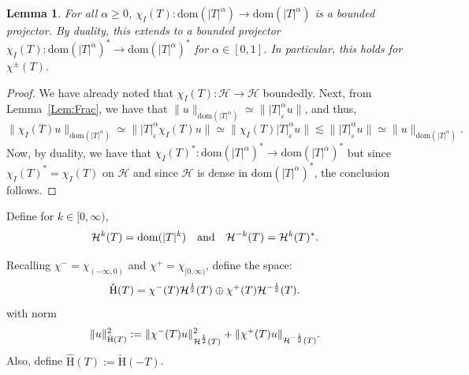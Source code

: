 \documentclass[a4paper,10pt,reqno]{amsart}
\newcommand{\modulus}[1]{|#1|}
\newcommand{\norm}[1]{\| #1 \|}%
\newcommand{\OpSobH}[2][{}]{{\mathcal{H}}^{#2}_{\rm #1}}
\newcommand{\checkH}{\check{\mathrm{H}}}
\newcommand{\hatH}{\hat{\mathrm{H}}}
\newcommand{\Hil}{\mathscr{H}}
\newcommand{\dom}{\mathrm{dom}}
\renewcommand{\epsilon}{\varepsilon}
\newtheorem{lemma}[theorem]{Lemma}
\theoremstyle{definition}
\begin{document}
\begin{lemma}
\label{Lem:ProjDualBdd}
For all $\alpha \geq 0$,  $\chi_{I}(T): \dom(\modulus{T}^\alpha) \to \dom(\modulus{T}^\alpha)$ is a bounded projector.
By duality, this extends to a bounded projector
$\chi_{I}(T): \dom(\modulus{T}^\alpha)^\ast \to \dom(\modulus{T}^\alpha)^\ast$ for $\alpha \in [0,1]$.
In particular, this holds for $\chi^{\pm}(T)$.
\end{lemma}
\begin{proof}

We have already noted that $\chi_{I}(T): \Hil \to \Hil$ boundedly.
Next, from Lemma~\ref{Lem:Frac}, we have that $\norm{u}_{\dom(\modulus{T}^\alpha)} \simeq \norm{ \modulus{T}_\epsilon^\alpha u}$, and thus,
$$
\norm{\chi_{I}(T)u}_{\dom(\modulus{T}^\alpha)} \simeq  \norm{ \modulus{T}_\epsilon^\alpha \chi_{I}(T) u} \simeq \norm{\chi_{I}(T) \modulus{T}_\epsilon^\alpha u} \lesssim \norm{\modulus{T}_\epsilon ^\alpha u} \simeq \norm{u}_{\dom(\modulus{T}^\alpha)}.$$
Now, by duality, we have that $\chi_{I}(T)^\ast: \dom(\modulus{T}^\alpha)^\ast \to \dom(\modulus{T}^\alpha)^\ast$ but since $\chi_{I}(T)^\ast = \chi_{I}(T)$ on $\Hil$ and since $\Hil$ is dense in $\dom(\modulus{T}^\alpha)^\ast$, the conclusion follows.
\end{proof}

Define for $k \in [0,\infty)$,
$$ \OpSobH{k}(T) = \dom(\modulus{T}^k)\quad\text{and}\quad\OpSobH{-k}(T) = \OpSobH{k}(T)^\ast.$$

Recalling $\chi^- = \chi_{(-\infty,0)}$ and $\chi^+ = \chi_{[0,\infty)}$, define the space:
\begin{equation}
\label{Eq:AbsCheck}
\checkH(T) = \chi^{-}(T) \OpSobH{\frac12}(T) \oplus\chi^{+}(T) \OpSobH{-\frac12}(T).
\end{equation}
with norm
\begin{equation}
\norm{u}_{\checkH(T)}^2 := \norm{\chi^{-}(T)u}^2_{\OpSobH{\frac{1}{2}}(T)} + \norm{\chi^+(T)u}_{\OpSobH{-\frac{1}{2}}(T)}.
\end{equation}
Also, define $\hatH(T) := \checkH(-T)$.
\end{document}
